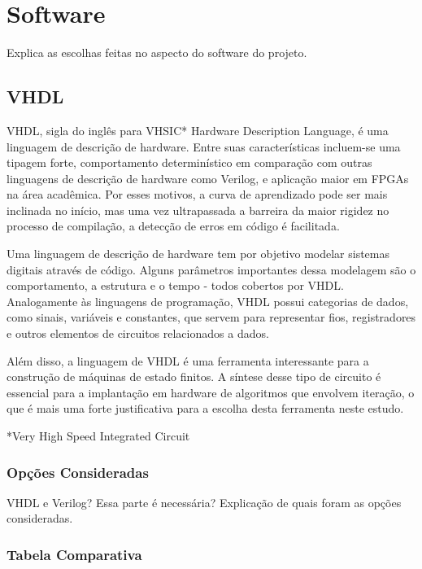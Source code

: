 	\section{Software}\label{sec-software}
	
	Explica as escolhas feitas no aspecto do software do projeto.
	
	\subsection{VHDL}\label{soft-vhdl}
	
	VHDL, sigla do inglês para VHSIC* Hardware Description Language, é uma linguagem de descrição de hardware.  Entre suas características incluem-se uma tipagem forte, comportamento determinístico em comparação com outras linguagens de descrição de hardware como Verilog, e aplicação maior em FPGAs na área acadêmica. Por esses motivos, a curva de aprendizado pode ser mais inclinada no início, mas uma vez ultrapassada a barreira da maior rigidez no processo de compilação, a detecção de erros em código é facilitada.
	
	Uma linguagem de descrição de hardware tem por objetivo modelar sistemas digitais através de código. Alguns parâmetros importantes dessa modelagem são o comportamento, a estrutura e o tempo - todos cobertos por VHDL. Analogamente às linguagens de programação, VHDL possui categorias de dados, como sinais, variáveis e constantes, que servem para representar fios, registradores e outros elementos de circuitos relacionados a dados. 
	
	Além disso, a linguagem de VHDL é uma ferramenta interessante para a construção de máquinas de estado finitos. A síntese desse tipo de circuito é essencial para a implantação em hardware de algoritmos que envolvem iteração, o que é mais uma forte justificativa para a escolha desta ferramenta neste estudo.
	
	
	*Very High Speed Integrated Circuit

	
	\subsubsection{Opções Consideradas}\label{vhdl-options}
	VHDL e Verilog?
	Essa parte é necessária? 
	Explicação de quais foram as opções consideradas.
	
	\subsubsection{Tabela Comparativa}\label{vhdl-table}
	
